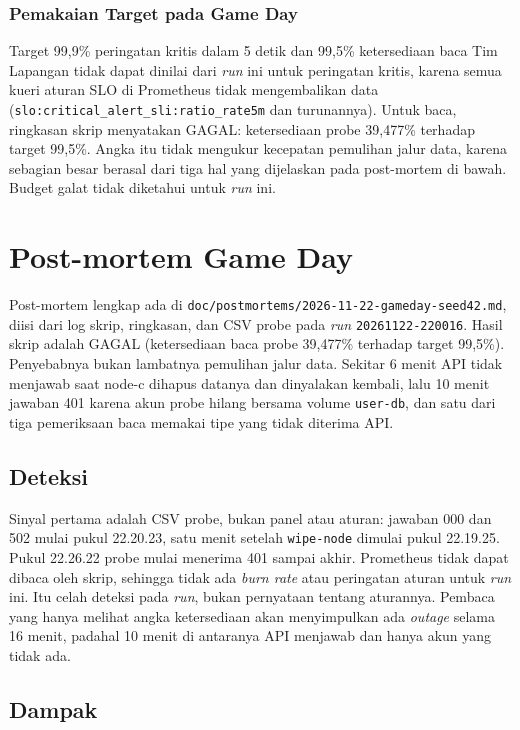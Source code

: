 \subsubsection*{Pemakaian Target pada Game Day}

Target 99,9\% peringatan kritis dalam 5 detik dan 99,5\% ketersediaan baca Tim Lapangan tidak dapat dinilai dari \textit{run} ini untuk peringatan kritis, karena semua kueri aturan SLO di Prometheus tidak mengembalikan data (\texttt{slo:critical\_alert\_sli:ratio\_rate5m} dan turunannya). Untuk baca, ringkasan skrip menyatakan GAGAL: ketersediaan probe 39,477\% terhadap target 99,5\%. Angka itu tidak mengukur kecepatan pemulihan jalur data, karena sebagian besar berasal dari tiga hal yang dijelaskan pada post-mortem di bawah. Budget galat tidak diketahui untuk \textit{run} ini.

\section{Post-mortem Game Day}

Post-mortem lengkap ada di \texttt{doc/postmortems/2026-11-22-gameday-seed42.md}, diisi dari log skrip, ringkasan, dan CSV probe pada \textit{run} \texttt{20261122-220016}. Hasil skrip adalah GAGAL (ketersediaan baca probe 39,477\% terhadap target 99,5\%). Penyebabnya bukan lambatnya pemulihan jalur data. Sekitar 6 menit API tidak menjawab saat node-c dihapus datanya dan dinyalakan kembali, lalu 10 menit jawaban 401 karena akun probe hilang bersama volume \texttt{user-db}, dan satu dari tiga pemeriksaan baca memakai tipe yang tidak diterima API.

\subsection{Deteksi}

Sinyal pertama adalah CSV probe, bukan panel atau aturan: jawaban 000 dan 502 mulai pukul 22.20.23, satu menit setelah \texttt{wipe-node} dimulai pukul 22.19.25. Pukul 22.26.22 probe mulai menerima 401 sampai akhir. Prometheus tidak dapat dibaca oleh skrip, sehingga tidak ada \textit{burn rate} atau peringatan aturan untuk \textit{run} ini. Itu celah deteksi pada \textit{run}, bukan pernyataan tentang aturannya. Pembaca yang hanya melihat angka ketersediaan akan menyimpulkan ada \textit{outage} selama 16 menit, padahal 10 menit di antaranya API menjawab dan hanya akun yang tidak ada.

\subsection{Dampak}

